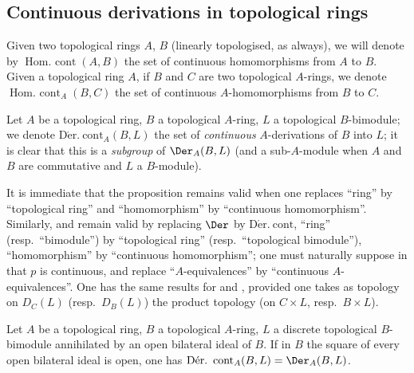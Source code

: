 \subsection{Continuous derivations in topological rings}
\label{subsection:0.20.3}

\begin{env}[20.3.1]
\label{0.20.3.1}
Given two topological rings $A$, $B$ (linearly topologised, as always), we will denote by $\operatorname{Hom.\ cont}(A,B)$ the set of continuous homomorphisms from $A$ to $B$.
Given a topological ring $A$, if $B$ and $C$ are two topological $A$-rings, we denote $\operatorname{Hom.\ cont}_A(B,C)$ the set of continuous $A$-homomorphisms from $B$ to $C$.

Let $A$ be a topological ring, $B$ a topological $A$-ring, $L$ a topological $B$-bimodule; we denote $\operatorname{D\acute{e}r.\ cont}_A(B,L)$ the set of \emph{continuous} $A$-derivations of $B$ into $L$; it is clear that this is a \emph{subgroup} of $\Der_A(B,L)$ (and a sub-$A$-module when $A$ and $B$ are commutative and $L$ a $B$-module).
\end{env}

\begin{env}[20.3.2]
\label{0.20.3.2}
It is immediate that the proposition  remains valid when one replaces ``ring'' by ``topological ring'' and ``homomorphism'' by ``continuous homomorphism''.
Similarly,  and  remain valid by replacing $\Der$ by $\operatorname{D\acute{e}r.\ cont}$, ``ring'' (resp.\ ``bimodule'') by ``topological ring'' (resp.\ ``topological bimodule''), ``homomorphism'' by ``continuous homomorphism''; one must naturally suppose in  that $p$ is continuous, and replace ``$A$-equivalences'' by ``continuous $A$-equivalences''.
One has the same results for  and , provided one takes as topology on $D_C(L)$ (resp.\ $D_B(L)$) the product topology (on $C\times L$, resp.\ $B\times L$).
\end{env}

\begin{proposition}[20.3.3]
\label{0.20.3.3}
Let $A$ be a topological ring, $B$ a topological $A$-ring, $L$ a discrete topological $B$-bimodule annihilated by an open bilateral ideal of $B$.
If in $B$ the square of every open bilateral ideal is open, one has $\operatorname{D\acute{e}r.\ cont}_A(B,L)=\Der_A(B,L)$.
\end{proposition}

